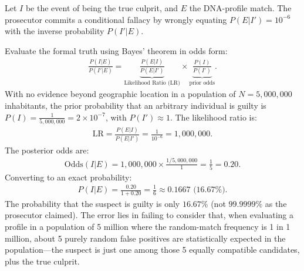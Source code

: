 \begin{solproblema}[prob:898898e]
	Let $I$ be the event of being the true culprit, and $E$ the DNA-profile match. The prosecutor commits a conditional fallacy by wrongly equating $P(E|I') = 10^{-6}$ with the inverse probability $P(I'|E)$.

	Evaluate the formal truth using Bayes' theorem in odds form:
	\begin{align}
		\frac{P(I|E)}{P(I'|E)} = \underbrace{\frac{P(E|I)}{P(E|I')}}_{\text{Likelihood Ratio (LR)}} \times \underbrace{\frac{P(I)}{P(I')}}_{\text{prior odds}}.
	\end{align}
	With no evidence beyond geographic location in a population of $N = 5,000,000$ inhabitants, the prior probability that an arbitrary individual is guilty is $P(I) = \frac{1}{5,000,000} = 2 \times 10^{-7}$, with $P(I') \approx 1$. The likelihood ratio is:
	\begin{align}
		\text{LR} = \frac{P(E|I)}{P(E|I')} = \frac{1}{10^{-6}} = 1,000,000.
	\end{align}
	The posterior odds are:
	\begin{align}
		\text{Odds}(I|E) = 1,000,000 \times \frac{1/5,000,000}{1} = \frac{1}{5} = 0.20.
	\end{align}
	Converting to an exact probability:
	\begin{align}
		P(I|E) = \frac{0.20}{1+0.20} = \frac{1}{6} \approx 0.1667 \text{ (16.67\%).}
	\end{align}
	The probability that the suspect is guilty is only $16.67\%$ (not $99.9999\%$ as the prosecutor claimed). The error lies in failing to consider that, when evaluating a profile in a population of 5 million where the random-match frequency is 1 in 1 million, about 5 purely random false positives are statistically expected in the population---the suspect is just one among those 5 equally compatible candidates, plus the true culprit.
\end{solproblema}

